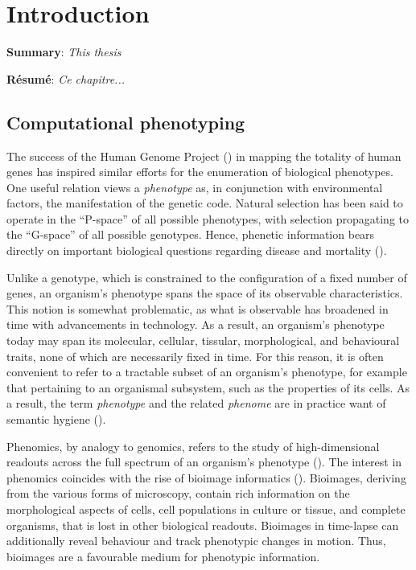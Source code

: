 
\chapter{Introduction} %

\label{Chapter1} %

\textbf{Summary}: \emph{This thesis }

\textbf{R\'esum\'e}: \emph{Ce chapitre...}



\section{Computational phenotyping}

The success of the Human Genome Project (\cite{lander2001initial}) in mapping the totality of human genes has inspired similar efforts for the enumeration of biological phenotypes. One useful relation views a \emph{phenotype} as, in conjunction with environmental factors, the manifestation of the genetic code. Natural selection has been said to operate in the ``P-space'' of all possible phenotypes, with selection propagating to the ``G-space'' of all possible genotypes. Hence, phenetic information bears directly on important biological questions regarding disease and mortality (\cite{houle2010phenomics}).

Unlike a genotype, which is constrained to the configuration of a fixed number of genes, an organism's phenotype spans the space of its observable characteristics. This notion is somewhat problematic, as what is observable has broadened in time with advancements in technology. As a result, an organism's phenotype today may span its molecular, cellular, tissular, morphological, and behavioural traits, none of which are necessarily fixed in time. For this reason, it is often convenient to refer to a tractable subset of an organism's phenotype, for example that pertaining to an organismal subsystem, such as the properties of its cells. As a result, the term \emph{phenotype} and the related \emph{phenome} are in practice want of semantic hygiene (\cite{mahner1997exactly}).

Phenomics, by analogy to genomics, refers to the study of high-dimensional readouts across the full spectrum of an organism's phenotype (\cite{houle2010phenomics}). The interest in phenomics coincides with the rise of bioimage informatics (\cite{myers2012bioimage}). Bioimages, deriving from the various forms of microscopy, contain rich information on the morphological aspects of cells, cell populations in culture or tissue, and complete organisms, that is lost in other biological readouts. Bioimages in time-lapse can additionally reveal behaviour and track phenotypic changes in motion. Thus, bioimages are a favourable medium for phenotypic information.

